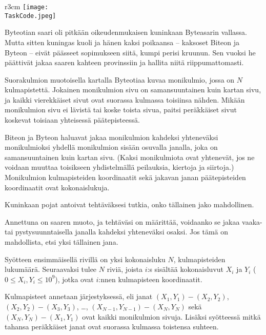 \documentclass{boi2014-fi}
\renewcommand{\TaskCode}{demarcation}
\begin{document}
    \begin{wrapfigure}{r}{3cm}
        \vspace{-24pt}
        \texttt{[image: \\TaskCode.jpeg]}
    \end{wrapfigure}

    Byteotian saari oli pitkään oikeudenmukaisen kuninkaan Byteasarin vallassa.
    Mutta sitten kuningas kuoli ja hänen kaksi poikaansa --
    kaksoset Biteon ja Byteon -- eivät päässeet sopimukseen siitä,
    kumpi perisi kruunun.
    Sen vuoksi he päättivät jakaa saaren kahteen provinssiin
    ja hallita niitä riippumattomasti.

    Suorakulmion muotoisella kartalla Byteotiaa kuvaa monikulmio,
    jossa on $N$ kulmapistettä.
    Jokainen monikulmion sivu on samansuuntainen kuin kartan sivu,
    ja kaikki vierekkäiset sivut ovat suorassa kulmassa toisiinsa nähden.
    Mikään monikulmion sivu ei lävistä tai koske toista sivua, paitsi
    peräkkäiset sivut koskevat toisiaan yhteisessä päätepisteessä.
    
    Biteon ja Byteon haluavat jakaa monikulmion kahdeksi yhteneväksi monikulmioksi
    yhdellä monikulmion sisään osuvalla janalla, joka on samansuuntainen
    kuin kartan sivu.
    (Kaksi monikulmiota ovat yhtenevät, jos ne voidaan muuttaa toisikseen
     yhdistelmällä peilauksia, kiertoja ja siirtoja.)
    Monikulmion kulmapisteiden koordinaatit sekä jakavan janan
    päätepisteiden koordinaatit ovat kokonaislukuja.

    Kuninkaan pojat antoivat tehtäväksesi tutkia,
    onko tällainen jako mahdollinen.

    \Task
    Annettuna on saaren muoto,
    ja tehtäväsi on määrittää, voidaanko se jakaa
    vaaka- tai pystysuunntaisella janalla kahdeksi yhteneväksi osaksi.
    Jos tämä on mahdollista, etsi yksi tällainen jana.
    
    \Input
    Syötteen ensimmäisellä rivillä on yksi kokonaisluku $N$,
    kulmapisteiden lukumäärä.
    Seuraavaksi tulee $N$ riviä, joista $i$:s sisältää kokonaisluvut
    $X_i$ ja $Y_i$ ($0 \le X_i, Y_i \le 10^9$), jotka ovat $i$:nnen kulmapisteen
    koordinaatit.
    
    Kulmapisteet annetaan järjestyksessä, eli
    janat $(X_1,Y_1) - (X_2,Y_2)$, $(X_2,Y_2) - (X_3,Y_3)$, \ldots, $(X_{N-1},Y_{N-1}) - (X_N,Y_N)$ sekä
    $(X_N,Y_N) - (X_1,Y_1)$ ovat kaikki monikulmion sivuja.
    Lisäksi syötteessä mitkä tahansa peräkkäiset janat ovat suorassa
    kulmassa toistensa suhteen.
\end{document}
